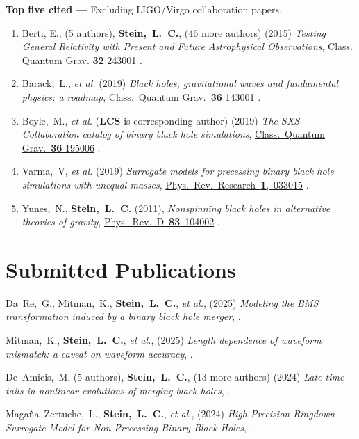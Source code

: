 {\bf Top five cited ---}%
Excluding LIGO/Virgo collaboration papers.
\begin{enumerate}
\item
  Berti, E., (5 authors), {\bf Stein,~L.~C.}, (46 more authors)
  (2015)
  {\it Testing General Relativity with Present and Future
    Astrophysical Observations},
  \href{http://dx.doi.org/10.1088/0264-9381/32/24/243001}{Class. Quantum Grav. {\bf 32} 243001}
  .
\item
  Barack,~L., {\it et al.}
  (2019)
  {\it Black holes, gravitational waves and fundamental physics: a roadmap},
  \href{https://doi.org/10.1088/1361-6382/ab0587}{Class.~Quantum Grav.~{\bf 36} 143001}
  .
\item
  Boyle,~M., {\it et al.} ({\bf LCS} is corresponding author)
  (2019)
  {\it The SXS Collaboration catalog of binary black hole simulations},
  \href{https://doi.org/10.1088/1361-6382/ab34e2}{Class.~Quantum Grav.~{\bf 36} 195006}
  .
\item
  Varma,~V, {\it et al.}
  (2019)
  {\it Surrogate models for precessing binary black hole simulations with
  unequal masses},
  \href{https://doi.org/10.1103/PhysRevResearch.1.033015}{Phys.~Rev.~Research~{\bf 1},~033015}
  .
\item
  Yunes,~N., {\bf Stein,~L.~C.}
  (2011),
  {\it Nonspinning black holes in alternative theories of gravity},
  \href{http://dx.doi.org/10.1103/PhysRevD.83.104002}{Phys.~Rev.~D~{\bf 83}~104002}
  .
\end{enumerate}
\else%
\fi

\renewcommand{\citeCount}[1]{}

\section{\sc Submitted Publications}
\begin{etaremune}[start=\value{pubCounter}]
\item
  Da~Re,~G.,
  Mitman,~K.,
  {\bf Stein,~L.~C.},
  {\it et al.},
  (2025)
  {\it Modeling the BMS transformation induced by a binary black hole merger},
  .
  \citeCount{0}
\item
  Mitman,~K.,
  {\bf Stein,~L.~C.},
  {\it et al.},
  (2025)
  {\it Length dependence of waveform mismatch: a caveat on waveform accuracy},
  .
  \citeCount{0}
\item
  De~Amicis,~M.
  (5 authors),
  {\bf Stein,~L.~C.},
  (13 more authors)
  (2024)
  {\it Late-time tails in nonlinear evolutions of merging black holes},
  .
  \citeCount{0}
\item
  Magaña~Zertuche,~L.,
  {\bf Stein,~L.~C.},
  {\it et al.},
  (2024)
  {\it High-Precision Ringdown Surrogate Model for Non-Precessing Binary Black Holes},
  .
  \citeCount{0}
  \setcounter{pubCounter}{\value{enumi}}
\end{etaremune}

